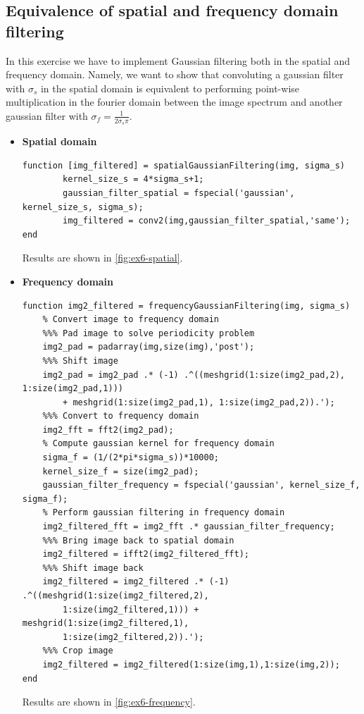 \documentclass[tikz,14pt,fleqn]{article}
\begin{document}
\subsection{Equivalence of spatial and frequency domain filtering}
In this exercise we have to implement Gaussian filtering both in the spatial and frequency domain. Namely, we want to show that convoluting a gaussian filter with $\sigma_s$ in the spatial domain is equivalent to performing point-wise multiplication in the fourier domain between the image spectrum and another gaussian filter with $\sigma_f = \frac{1}{2\sigma_s \pi}$.
\begin{itemize}
    \item \textbf{Spatial domain}
\begin{verbatim} 
function [img_filtered] = spatialGaussianFiltering(img, sigma_s)
        kernel_size_s = 4*sigma_s+1;
        gaussian_filter_spatial = fspecial('gaussian', kernel_size_s, sigma_s);
        img_filtered = conv2(img,gaussian_filter_spatial,'same');
end
\end{verbatim}
Results are shown in \autoref{fig:ex6-spatial}.
    \item \textbf{Frequency domain}
\begin{verbatim} 
function img2_filtered = frequencyGaussianFiltering(img, sigma_s)
    % Convert image to frequency domain
    %%% Pad image to solve periodicity problem
    img2_pad = padarray(img,size(img),'post');
    %%% Shift image
    img2_pad = img2_pad .* (-1) .^((meshgrid(1:size(img2_pad,2), 1:size(img2_pad,1))) 
        + meshgrid(1:size(img2_pad,1), 1:size(img2_pad,2)).');
    %%% Convert to frequency domain
    img2_fft = fft2(img2_pad);
    % Compute gaussian kernel for frequency domain
    sigma_f = (1/(2*pi*sigma_s))*10000;
    kernel_size_f = size(img2_pad);
    gaussian_filter_frequency = fspecial('gaussian', kernel_size_f, sigma_f);
    % Perform gaussian filtering in frequency domain
    img2_filtered_fft = img2_fft .* gaussian_filter_frequency;
    %%% Bring image back to spatial domain
    img2_filtered = ifft2(img2_filtered_fft);
    %%% Shift image back
    img2_filtered = img2_filtered .* (-1) .^((meshgrid(1:size(img2_filtered,2), 
        1:size(img2_filtered,1))) + meshgrid(1:size(img2_filtered,1), 
        1:size(img2_filtered,2)).');
    %%% Crop image
    img2_filtered = img2_filtered(1:size(img,1),1:size(img,2));
end
\end{verbatim}
Results are shown in \autoref{fig:ex6-frequency}.
\end{itemize}
\end{document}
